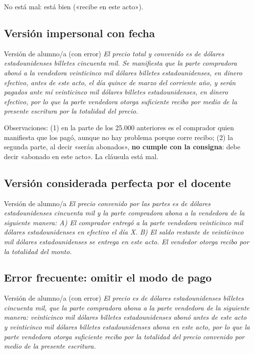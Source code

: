 \documentclass[12pt,oneside]{book}
\begin{document}
No está mal: está bien («recibe en este acto»).

\subsection{Versión impersonal con fecha}

\begin{example}{Versión de alumno/a (con error)}
\textit{El precio total y convenido es de dólares estadounidenses billetes cincuenta mil. Se manifiesta que la parte compradora abonó a la vendedora veinticinco mil dólares billetes estadounidenses, en dinero efectivo, antes de este acto, el día quince de marzo del corriente año, y serán pagados ante mí veinticinco mil dólares billetes estadounidenses, en dinero efectivo, por lo que la parte vendedora otorga suficiente recibo por medio de la presente escritura por la totalidad del precio.}
\end{example}

Observaciones: (1) en la parte de los 25.000 anteriores es el comprador quien manifiesta que los pagó, aunque no hay problema porque corre recibo; (2) la segunda parte, al decir «serán abonados», \textbf{no cumple con la consigna}: debe decir «abonado en este acto». La cláusula está mal.

\subsection{Versión considerada perfecta por el docente}

\begin{example}{Versión de alumno/a}
\textit{El precio convenido por las partes es de dólares estadounidenses cincuenta mil y la parte compradora abona a la vendedora de la siguiente manera: A) El comprador entregó a la parte vendedora veinticinco mil dólares estadounidenses en efectivo el día X. B) El saldo restante de veinticinco mil dólares estadounidenses se entrega en este acto. El vendedor otorga recibo por la totalidad del monto.}
\end{example}

\subsection{Error frecuente: omitir el modo de pago}

\begin{example}{Versión de alumno/a (con error)}
\textit{El precio es de dólares estadounidenses billetes cincuenta mil, que la parte compradora abona a la parte vendedora de la siguiente manera: veinticinco mil dólares billetes estadounidenses abonó antes de este acto y veinticinco mil dólares billetes estadounidenses abona en este acto, por lo que la parte vendedora otorga suficiente recibo por la totalidad del precio convenido por medio de la presente escritura.}
\end{example}
\end{document}
